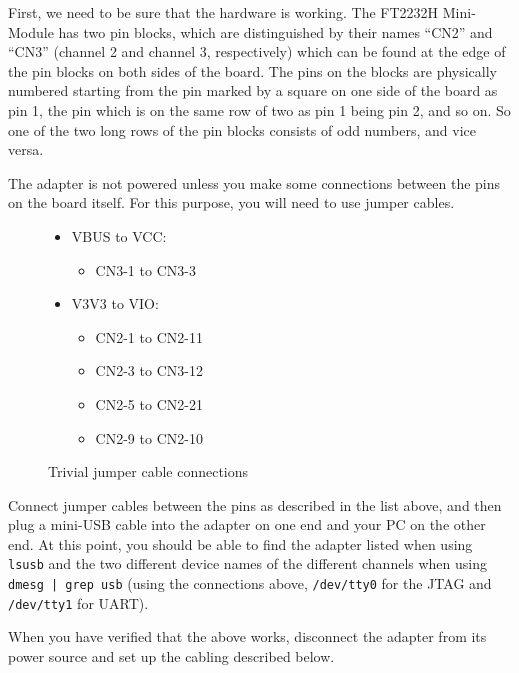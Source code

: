 \documentclass[a4paper,11pt,reqno]{amsart}
\begin{document}
First, we need to be sure that the hardware is working. The FT2232H Mini-Module has two pin blocks, which are distinguished by their names ``CN2'' and ``CN3'' (channel 2 and channel 3, respectively) which can be found at the edge of the pin blocks on both sides of the board. The pins on the blocks are physically numbered starting from the pin marked by a square on one side of the board as pin 1, the pin which is on the same row of two as pin 1 being pin 2, and so on. So one of the two long rows of the pin blocks consists of odd numbers, and vice versa.

The adapter is not powered unless you make some connections between the pins on the board itself. For this purpose, you will need to use jumper cables.

\begin{figure}[hb]
\begin{center}
\begin{itemize}
\item VBUS to VCC:
		\begin{itemize}
		\item CN3-1 to CN3-3
		\end{itemize}
\item V3V3 to VIO:
		\begin{itemize}
		\item CN2-1 to CN2-11
		\item CN2-3 to CN3-12
		\item CN2-5 to CN2-21
		\item CN2-9 to CN2-10
		\end{itemize}
\end{itemize}
\end{center}
\caption{Trivial jumper cable connections}
\label{fig:con1}
\end{figure}

Connect jumper cables between the pins as described in the list above, and then plug a mini-USB cable into the adapter on one end and your PC on the other end. At this point, you should be able to find the adapter listed when using \texttt{lsusb} and the two different device names of the different channels when using \texttt{dmesg | grep usb} (using the connections above, \texttt{/dev/tty0} for the JTAG and \texttt{/dev/tty1} for UART).

When you have verified that the above works, disconnect the adapter from its power source and set up the cabling described below.
\end{document}
